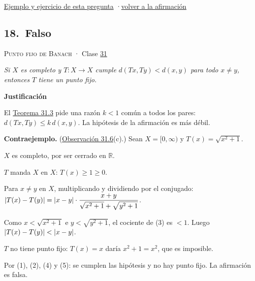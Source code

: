 \documentclass[11pt,a4paper]{article}
\newcommand{\R}{\mathbb{R}}\newcommand{\N}{\mathbb{N}}\newcommand{\Q}{\mathbb{Q}}
\providecommand{\lt}{<}\providecommand{\gt}{>}
\newcommand{\bloque}[1]{\par\smallskip\noindent\textbf{\color{acento}#1}\par}
\begin{document}
\par{}
\par{\small \hyperlink{e-17}{Ejemplo y ejercicio de esta pregunta} \quad·\quad \hyperlink{q-17}{volver a la afirmación}}
\subsection*{\hypertarget{r-18}{}18.\ \textcolor{bad}{Falso}}
{\small \textsc{Punto fijo de Banach} · Clase \href{https://decostruttivismo.github.io/MAT2514-repaso/pdf/MAT2514_apuntes_completos.pdf\#nameddest=section.31}{31}}\par
\emph{Si $X$ es completo y $T\colon X\to X$ cumple $d(Tx,Ty)\lt d(x,y)$ para todo $x\ne y$, entonces $T$ tiene un punto fijo.}
\bloque{Justificación}
\begin{pasos}
\item[] El \href{https://decostruttivismo.github.io/MAT2514-repaso/pdf/MAT2514_apuntes_completos.pdf\#nameddest=teorema.31.3}{Teorema 31.3} pide una razón $k\lt 1$ común a todos los pares: $d(Tx,Ty)\le k\,d(x,y)$. La hipótesis de la afirmación es más débil.
\item[] \textbf{Contraejemplo.} (\href{https://decostruttivismo.github.io/MAT2514-repaso/pdf/MAT2514_apuntes_completos.pdf\#nameddest=teorema.31.6}{Observación 31.6}(c).) Sean $X=[0,\infty)$ y $T(x)=\sqrt{x^2+1}$.
\item[(1)] $X$ es completo, por ser cerrado en $\R$.
\item[(2)] $T$ manda $X$ en $X$: $T(x)\ge1\ge0$.
\item[(3)] Para $x\ne y$ en $X$, multiplicando y dividiendo por el conjugado: $\lvert T(x)-T(y)\rvert=\lvert x-y\rvert\cdot\dfrac{x+y}{\sqrt{x^2+1}+\sqrt{y^2+1}}$.
\item[(4)] Como $x\lt \sqrt{x^2+1}$ e $y\lt \sqrt{y^2+1}$, el cociente de (3) es $\lt 1$. Luego $\abs{T(x)-T(y)}\lt \abs{x-y}$.
\item[(5)] $T$ no tiene punto fijo: $T(x)=x$ daría $x^2+1=x^2$, que es imposible.
\item[] Por (1), (2), (4) y (5): se cumplen las hipótesis y no hay punto fijo. La afirmación es falsa.
\end{pasos}
\end{document}
